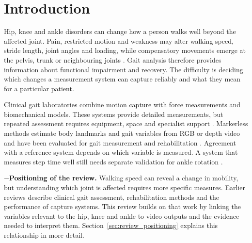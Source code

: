 \documentclass[12pt,nopreprintline]{elsarticle}
\begin{document}
\section{Introduction}
\label{sec:introduction}
\begin{revision}
Hip, knee and ankle disorders can change how a person walks well beyond the affected joint. Pain, restricted motion and weakness may alter walking speed, stride length, joint angles and loading, while compensatory movements emerge at the pelvis, trunk or neighbouring joints \cite{hertling2006management,ornetti2010gait,astephen2008biomechanical,shakoor2003asymmetric,ro2019effects}. Gait analysis therefore provides information about functional impairment and recovery. The difficulty is deciding which changes a measurement system can capture reliably and what they mean for a particular patient.

Clinical gait laboratories combine motion capture with force measurements and biomechanical models. These systems provide detailed measurements, but repeated assessment requires equipment, space and specialist support \cite{hulleck2022present,prakash2018recent}. Markerless methods estimate body landmarks and gait variables from RGB or depth video and have been evaluated for gait measurement and rehabilitation \cite{stenum2021two,uccheddu2022rgb,wang2024markerless,stenum2024clinical}. Agreement with a reference system depends on which variable is measured. A system that measures step time well still needs separate validation for ankle rotation \cite{scataglini2024accuracy}.

$-$\noindent\textbf{Positioning of the review.} Walking speed can reveal a change in mobility, but understanding which joint is affected requires more specific measures. Earlier reviews describe clinical gait assessment, rehabilitation methods and the performance of capture systems. This review builds on that work by linking the variables relevant to the hip, knee and ankle to video outputs and the evidence needed to interpret them. Section~\ref{sec:review_positioning} explains this relationship in more detail.


\end{revision}
\end{document}
